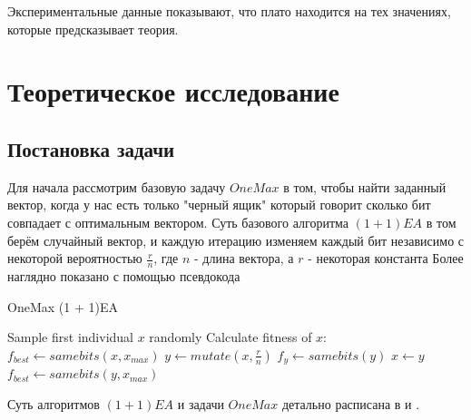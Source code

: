 \documentclass[times,specification,annotation]{itmo-student-thesis}
\begin{document}
    Экспериментальные данные показывают, что плато находится на тех значениях, которые предсказывает теория.

    \chapter{Теоретическое исследование}

    \section{Постановка задачи}

    Для начала рассмотрим базовую задачу $OneMax$ в том, чтобы найти заданный вектор, когда у нас есть только "черный ящик" который говорит сколько бит совпадает с оптимальным вектором.
    Суть базового алгоритма $(1 + 1)EA$ в том берём случайный вектор, и каждую итерацию изменяем каждый бит независимо с некоторой вероятностью $\frac{r}{n}$, где $n$ - длина вектора, а $r$ - некоторая константа
    Более наглядно показано с помощью псевдокода
    \begin{algorithm}
        \caption{OneMax (1 + 1)EA}\label{alg:Example}
        \begin{algorithmic}[1]
            \State Sample first individual $x$ randomly
            \State Calculate fitness of $x$: $f_{best} \leftarrow samebits(x, x_{max})$
                \State $y \leftarrow mutate(x, \frac{r}{n})$
                \State $f_y \leftarrow samebits(y)$
                    \State $x \leftarrow y$
                    \State $f_{best} \leftarrow samebits(y, x_{max})$
                \EndIf
            \EndWhile
        \end{algorithmic}
    \end{algorithm}


    Суть алгоритмов $(1 + 1)EA$ и задачи $OneMax$ детально расписана в \cite{base_one_max_1} и \cite{base_one_max_2}.
\end{document}
